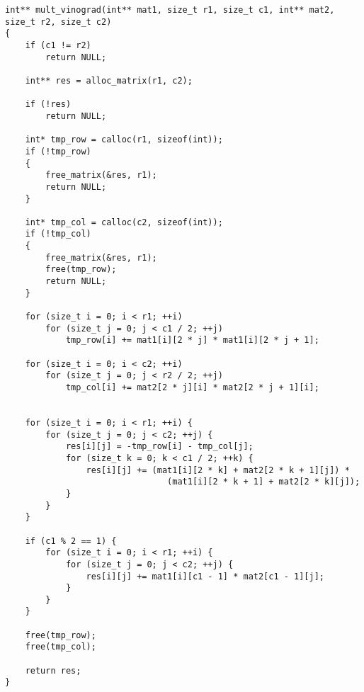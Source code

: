 \begin{center}
	\captionsetup{justification=centering, singlelinecheck=off}
	\begin{lstlisting}[label=lst:vin_mult, caption=Алгоритм Копперсмита--Винограда умножения матриц]
int** mult_vinograd(int** mat1, size_t r1, size_t c1, int** mat2, size_t r2, size_t c2)
{
    if (c1 != r2)
        return NULL;

    int** res = alloc_matrix(r1, c2);

    if (!res)
        return NULL;

    int* tmp_row = calloc(r1, sizeof(int));
    if (!tmp_row)
    {
        free_matrix(&res, r1);
        return NULL;
    }

    int* tmp_col = calloc(c2, sizeof(int));
    if (!tmp_col)
    {
        free_matrix(&res, r1);
        free(tmp_row);
        return NULL;
    }

    for (size_t i = 0; i < r1; ++i)
        for (size_t j = 0; j < c1 / 2; ++j)
            tmp_row[i] += mat1[i][2 * j] * mat1[i][2 * j + 1];

    for (size_t i = 0; i < c2; ++i)
        for (size_t j = 0; j < r2 / 2; ++j)
            tmp_col[i] += mat2[2 * j][i] * mat2[2 * j + 1][i];


    for (size_t i = 0; i < r1; ++i) {
        for (size_t j = 0; j < c2; ++j) {
            res[i][j] = -tmp_row[i] - tmp_col[j];
            for (size_t k = 0; k < c1 / 2; ++k) {
                res[i][j] += (mat1[i][2 * k] + mat2[2 * k + 1][j]) *
                                (mat1[i][2 * k + 1] + mat2[2 * k][j]);
            }
        }
    }

    if (c1 % 2 == 1) {
        for (size_t i = 0; i < r1; ++i) {
            for (size_t j = 0; j < c2; ++j) {
                res[i][j] += mat1[i][c1 - 1] * mat2[c1 - 1][j];
            }
        }
    }

    free(tmp_row);
    free(tmp_col);

    return res;
}
	\end{lstlisting}
\end{center}

